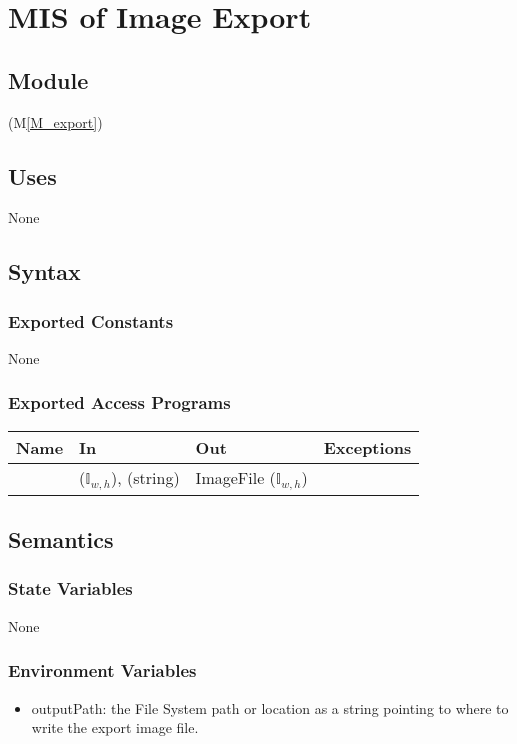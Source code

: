 \documentclass[12pt, titlepage]{article}
\newcommand{\mref}[1]{M\ref{#1}}
\newcommand{\mrefp}[1]{(\mref{#1})}
\begin{document}
\section{MIS of Image Export} \label{MS_ImageExport}

\subsection{Module}
 \mrefp{M_export}

\subsection{Uses}
None

\subsection{Syntax}

\subsubsection{Exported Constants}
None

\subsubsection{Exported Access Programs}

\begin{center}
\begin{tabular}{L{2cm} L{4cm} L{4cm} L{2cm}}
\hline
\textbf{Name} & \textbf{In} & \textbf{Out} & \textbf{Exceptions} \\
\hline
{} &  ($\mathbb{I}_{w,h}$),  (string)
  & ImageFile ($\mathbb{I}_{w,h}$) &  \\
\hline
\end{tabular}
\end{center}

\subsection{Semantics}

\subsubsection{State Variables}
None

\subsubsection{Environment Variables}
\begin{itemize}
  \item outputPath: the File System path or location as a string pointing to where to write the export image file.
\end{itemize}
\end{document}
